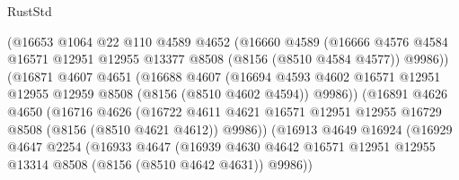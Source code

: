 \begin{lexlean}{RustStd}
\begin{coremodule}
{\begin{coremodule}
{{{{{{{{{{{{{{{{{{{{{{{{{{{{{{{{{{                        (@16653
                          @1064
                          @22
                          @110
                          @4589
                          @4652
                          (@16660
                            @4589
                            (@16666
                              @4576
                              @4584
                              @16571
                              @12951
                              @12955
                              @13377
                              @8508
                              (@8156 (@8510 @4584 @4577))
                              @9986))
                          (@16871
                            @4607
                            @4651
                            (@16688
                              @4607
                              (@16694
                                @4593
                                @4602
                                @16571
                                @12951
                                @12955
                                @12959
                                @8508
                                (@8156 (@8510 @4602 @4594))
                                @9986))
                            (@16891
                              @4626
                              @4650
                              (@16716
                                @4626
                                (@16722
                                  @4611
                                  @4621
                                  @16571
                                  @12951
                                  @12955
                                  @16729
                                  @8508
                                  (@8156 (@8510 @4621 @4612))
                                  @9986))
                              (@16913
                                @4649
                                @16924
                                (@16929
                                  @4647
                                  @2254
                                  (@16933
                                    @4647
                                    (@16939
                                      @4630
                                      @4642
                                      @16571
                                      @12951
                                      @12955
                                      @13314
                                      @8508
                                      (@8156 (@8510 @4642 @4631))
                                      @9986))
}}}}}}}}}}}}}}}}}}}}}}}}}}}}}}}}}}
\end{coremodule}}
\end{coremodule}
\end{lexlean}
